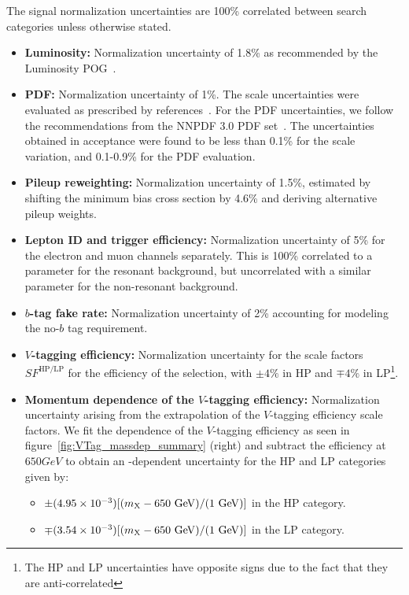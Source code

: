 The signal normalization uncertainties are 100\% correlated between search categories unless otherwise stated.
\begin{itemize}
  \item {\bfseries Luminosity:} Normalization uncertainty of 1.8\% as recommended by the Luminosity POG~\cite{LumiPOG}.
  \item {\bfseries PDF:} Normalization uncertainty of 1\%.
  The scale uncertainties were evaluated as prescribed by references~\cite{Cacciari_2004,Catani_2003}.
  For the PDF uncertainties, we follow the recommendations from the NNPDF 3.0 PDF set~\cite{Ball2011296}.
  The uncertainties obtained in acceptance were found to be less than 0.1\% for the scale variation, and 0.1-0.9\% for the PDF evaluation.
  \item {\bfseries Pileup reweighting:} Normalization uncertainty of 1.5\%, estimated by shifting the minimum bias cross section by 4.6\% and deriving alternative pileup weights.
  \item {\bfseries Lepton ID and trigger efficiency:} Normalization uncertainty of 5\% for the electron and muon channels separately.
  This is 100\% correlated to a parameter for the resonant background, but uncorrelated with a similar parameter for the non-resonant background.
  \item {\bfseries $b$-tag fake rate:} Normalization uncertainty of 2\% accounting for modeling the no-$b$ tag requirement.
  \item {\bfseries $V$-tagging efficiency:} Normalization uncertainty for the scale factors $SF^{\mathrm{HP}/\mathrm{LP}}$ for the efficiency of the \nsubjDDT selection, with $\pm4\%$ in HP and $\mp4\%$ in LP\footnote{The HP and LP uncertainties have opposite signs due to the fact that they are anti-correlated}.
  \item {\bfseries Momentum dependence of the $V$-tagging efficiency:} Normalization uncertainty arising from the extrapolation of the $V$-tagging efficiency scale factors.
  We fit the \MX dependence of the $V$-tagging efficiency as seen in figure~\ref{fig:VTag_massdep_summary} (right) and subtract the efficiency at $650\unit{GeV}$ to obtain an \MX-dependent uncertainty for the HP and LP categories given by:
  \begin{itemize}
    \item $\pm(4.95\times10^{-3})[(\MX-650\unit{GeV})/(1\unit{GeV})]$ in the HP category.
    \item $\mp(3.54\times10^{-3})[(\MX-650\unit{GeV})/(1\unit{GeV})]$ in the LP category.

\end{itemize}
\end{itemize}

